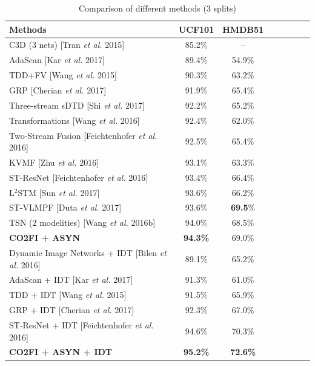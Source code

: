 \documentclass[letterpaper]{article}
\begin{document}
\begin{table}
\centering
\caption{Comparison of different methods (3 splits) %
}\label{tab:cmcTable3}
\scriptsize{
\begin{adjustbox}{width=0.79\columnwidth}
\begin{tabular}{|p{5.3cm}|c|*{5}{c|}c}
\hline
\textbf{Methods}& UCF101& HMDB51 \\
\hline
C3D (3 nets) [Tran \emph{et al.} 2015]&  85.2\%& -- \\%
AdaScan [Kar \emph{et al.} 2017] &  89.4\%& 54.9\% \\%
TDD+FV [Wang \emph{et al.} 2015]&  90.3\%& 63.2\% \\%
GRP [Cherian \emph{et al.} 2017]&  91.9\%& 65.4\%\\
Three-stream sDTD [Shi \emph{et al.} 2017]&  92.2\%& 65.2\%\\
Transformations [Wang \emph{et al.} 2016] &  92.4\%& 62.0\%\\  %
Two-Stream Fusion [Feichtenhofer \emph{et al.} 2016]&  92.5\%& 65.4\%\\
KVMF [Zhu \emph{et al.} 2016]&  93.1\%& 63.3\%\\
ST-ResNet [Feichtenhofer \emph{et al.} 2016]&  93.4\%& 66.4\%\\
L$^2$STM [Sun \emph{et al.} 2017]&  93.6\%& 66.2\%\\
ST-VLMPF [Duta \emph{et al.} 2017]&  93.6\%& {\bf 69.5}\%\\
TSN (2 modelities) [Wang \emph{et al.} 2016b] &  94.0\%& 68.5\%\\
{\bf CO2FI + ASYN}& {\bf 94.3\%}& {69.0\%}  \\
\hline
Dynamic Image Networks + IDT [Bilen \emph{et al.} 2016] &  89.1\%& 65.2\% \\%
AdaScan + IDT [Kar \emph{et al.} 2017] &  91.3\%& 61.0\% \\%
TDD + IDT [Wang \emph{et al.} 2015]&  91.5\%& 65.9\%\\
GRP + IDT [Cherian \emph{et al.} 2017]&  92.3\%& 67.0\%\\
ST-ResNet + IDT [Feichtenhofer \emph{et al.} 2016]&  94.6\%& 70.3\%\\
{\bf CO2FI + ASYN + IDT}& {\bf 95.2\%}& {\bf 72.6\%}  \\
\hline
\end{tabular}
\end{adjustbox}}
\end{table}
\end{document}
